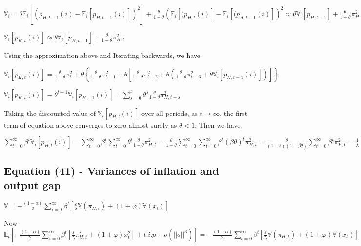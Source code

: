 \documentclass[
]{article}
\begin{document}
\(\displaystyle \mathbb{V}_i = \theta \mathbb{E}_i[(p_{H,t-1}(i)-\mathbb{E}_i[p_{H,t-1}(i)])^2] + \frac{\theta}{1-\theta}\left( \mathbb{E}_i[(p_{H,t}(i)]- \mathbb{E}_i[(p_{H,t-1}(i)]\right)^2 \approx \theta \mathbb{V}_i[p_{H,t-1}] + \frac{\theta}{1-\theta} \pi_{H,t}^2\)

\(\displaystyle \mathbb{V}_i[p_{H,t}(i)] \approx \theta \mathbb{V}_i[p_{H,t-1}] + \frac{\theta}{1-\theta} \pi_{H,t}^2\)

Using the approximation above and Iterating backwards, we have:

\(\displaystyle \mathbb{V}_i[p_{H,t}(i)]= \frac{\theta}{1-\theta} \pi_t^2+\theta \left\{\frac{\theta}{1-\theta} \pi_{t-1}^2+\theta \left[ \frac{\theta}{1-\theta} \pi_{t-2}^2+\theta \left( \frac{\theta}{1-\theta} \pi_{t-3}^2+\theta \mathbb{V}_i[p_{H,t-4}(i)] \right) \right] \right\}\)

\(\displaystyle \mathbb{V}_i[p_{H,t}(i)]= \theta^{t+1}\mathbb{V}_i[p_{H,-1}(i)]+ \sum_{s=0}^{t} \theta^s \frac{\theta}{1-\theta} \pi_{H,t-s}^2\)

Taking the discounted value of \(\mathbb{V}_i[p_{H,t}(i)]\) over all
periods, as \(t \to \infty\), the first term of equation above converges
to zero almost surely as \(\theta < 1\). Then we have,

\(\displaystyle \sum_{t=0}^{\infty} \beta^t \mathbb{V}_i[p_{H,t}(i)] = \sum_{t=0}^{\infty} \beta^t \sum_{t=0}^\infty\theta^t \frac{\theta}{1-\theta} \pi_{H,t}^2 = \frac{\theta}{1-\theta} \sum_{t=0}^{\infty} \sum_{t=0}^{\infty} \beta^{t} (\beta \theta)^t \pi_{H,t}^2 = \frac{\theta}{(1-\theta)(1-\beta \theta)}\sum_{t=0}^{\infty}\beta^t\pi_{H,t}^2 = \frac{1}{\lambda}\sum_{t=0}^{\infty}\beta^t\pi_{H,t}^2\)

\vspace{12pt}

\hypertarget{equation-41---variances-of-inflation-and-output-gap}{%
\subsection{Equation (41) - Variances of inflation and output
gap}\label{equation-41---variances-of-inflation-and-output-gap}}

\(\displaystyle \mathbb{V} = -\frac{(1-\alpha)}{2}\sum_{i=0}^{\infty} \beta^t \left[ \frac{\varepsilon}{\lambda}\mathbb{V}(\pi_{H,t})+ (1+\varphi)\mathbb{V}(x_t) \right]\)

\vspace{8pt}

Now
\(\displaystyle \mathbb{E}_t \left[ -\frac{(1-\alpha)}{2}\sum_{i=0}^{\infty} \beta^t \left[ \frac{\varepsilon}{\lambda}\pi_{H,t}^2+ (1+\varphi)x_t^2 \right] + t.i.p+ o(||a||^3) \right] = -\frac{(1-\alpha)}{2}\sum_{i=0}^{\infty} \beta^t \left[ \frac{\varepsilon}{\lambda}\mathbb{V}(\pi_{H,t})+ (1+\varphi)\mathbb{V}(x_t) \right]\)
\end{document}
